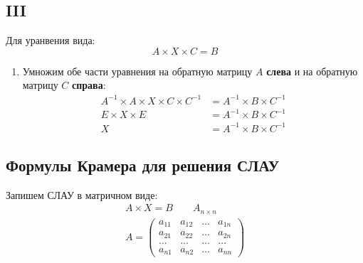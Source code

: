 \subsection*{III}

Для уранвения вида: \[
A \times X \times C = B
\] 
\begin{enumerate}
  \item Умножим обе части уравнения на обратную матрицу $A$ \textbf{слева} и на обратную матрицу $C$ \textbf{справа}:
  \begin{align*}
    A^{-1} \times  A \times  X \times C \times C^{-1} &= A^{-1} \times B \times C^{-1} \\
    E \times  X \times E &= A^{-1} \times B \times C^{-1} \\
    X &= A^{-1} \times B \times C^{-1}
  \end{align*}
\end{enumerate}

\subsection{Формулы Крамера для решения СЛАУ}

Запишем СЛАУ в матричном виде: 
\begin{gather*}
  A \times X = B \qquad A_{n \times n} \\
  A = \left( 
  \begin{matrix}
    a_{11} & a_{12} & \ldots & a_{1n} \\
    a_{21} & a_{22} & \ldots & a_{2n} \\
    \ldots & \ldots & \ldots & \ldots \\
    a_{n1} & a_{n2} & \ldots & a_{nn}
  \end{matrix}
  \right) 
\end{gather*}

